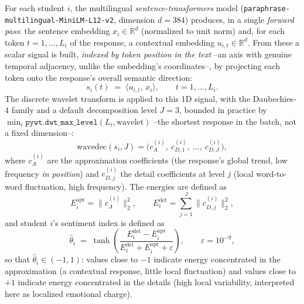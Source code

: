 \documentclass[11pt,a4paper,oneside]{article}
\theoremstyle{definition}
\begin{document}
For each student $i$, the multilingual \emph{sentence-transformers} model
(\texttt{paraphrase-\allowbreak multilingual-\allowbreak MiniLM-\allowbreak L12-\allowbreak v2},
dimension $d=384$) \cite{ReimersGurevych2019}
produces, in a single \emph{forward pass}: the sentence embedding $x_i\in\mathbb{R}^d$
(normalized to unit norm) and, for each token $t=1,\ldots,L_i$ of the response, a contextual
embedding $u_{i,t}\in\mathbb{R}^d$. From these a scalar signal is built, \emph{indexed by token
position in the text} --an axis with genuine temporal adjacency, unlike the embedding's
coordinates--, by projecting each token onto the response's overall semantic direction:
\[
s_i(t) \;=\; \langle u_{i,t},\, x_i\rangle, \qquad t=1,\ldots,L_i.
\]
The discrete wavelet transform \cite{Mallat1989} is applied to this 1D signal, with the
Daubechies-4 family and a default decomposition level $J=3$, bounded in practice by
$\min_i \texttt{pywt.dwt\_max\_level}(L_i,\text{wavelet})$ --the shortest response in the batch,
not a fixed dimension--:
\[
\mathrm{wavedec}(s_i, J) = \big(c^{(i)}_A,\ c^{(i)}_{D,1},\ \ldots,\ c^{(i)}_{D,J}\big),
\]
where $c^{(i)}_A$ are the approximation coefficients (the response's global trend, low frequency
\emph{in position}) and $c^{(i)}_{D,j}$ the detail coefficients at level $j$ (local
word-to-word fluctuation, high frequency). The energies are defined as
\[
E^{\mathrm{apr}}_i = \big\lVert c^{(i)}_A \big\rVert_2^2,
\qquad
E^{\mathrm{det}}_i = \sum_{j=1}^{J} \big\lVert c^{(i)}_{D,j} \big\rVert_2^2 ,
\]
and student $i$'s sentiment index is defined as
\[
\hat\theta_i \;=\; \tanh\!\left(\frac{E^{\mathrm{det}}_i - E^{\mathrm{apr}}_i}
{E^{\mathrm{det}}_i + E^{\mathrm{apr}}_i + \varepsilon}\right), \qquad \varepsilon = 10^{-9},
\]
so that $\hat\theta_i\in(-1,1)$: values close to $-1$ indicate energy concentrated in the
approximation (a contextual response, little local fluctuation) and values close to $+1$
indicate energy concentrated in the details (high local variability, interpreted here as
localized emotional charge).
\end{document}
